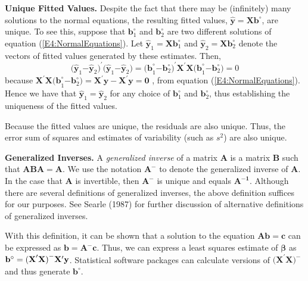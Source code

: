 \textbf{Unique Fitted Values.} Despite the fact that there may be
(infinitely) many solutions to the normal equations, the resulting
fitted values, $\mathbf{\hat{y}}=\mathbf{Xb}^{\circ }$, are unique.
To see this, suppose that $\mathbf{b}_1^{\circ }$ and
$\mathbf{b}_2^{\circ }$ are two
different solutions of equation (\ref{E4:NormalEquations}). Let $\mathbf{\hat{y}}_1=\mathbf{Xb%
}_1^{\circ }$ and $\mathbf{\hat{y}}_2=\mathbf{Xb}_2^{\circ }$ denote
the vectors of fitted values generated by these estimates. Then,
\begin{equation*}
\mathbf{(\hat{y}}_1\mathbf{-\hat{y}}_2\mathbf{)}^{\prime}\mathbf{(\hat{y%
}}_1\mathbf{-\hat{y}}_2\mathbf{)}=\mathbf{(b}_1^{\circ }\mathbf{-b}%
_2^{\circ
}\mathbf{)}^{\prime}\mathbf{X}^{\prime}\mathbf{X(b}_1^{\circ
}\mathbf{-b}_2^{\circ }\mathbf{)}=0
\end{equation*}
because $\mathbf{X}^{\prime}\mathbf{X(b}_1^{\circ
}\mathbf{-b}_2^{\circ
}\mathbf{)}=\mathbf{X}^{\prime}\mathbf{y-X}^{\prime}\mathbf{y}=\mathbf{0}$%
, from equation (\ref{E4:NormalEquations}). Hence we have that $\mathbf{\hat{y}}_1\mathbf{=%
\hat{y}}_2$ for any choice of $\mathbf{b}_1^{\circ }$ and $\mathbf{b}%
_2^{\circ }$, thus establishing the uniqueness of the fitted values.

\qquad Because the fitted values are unique, the residuals are also
unique. Thus, the error sum of squares and estimates of variability
(such as $s^2$) are also unique.

\textbf{Generalized Inverses.} A \emph{generalized inverse} of a
matrix $\mathbf{A}$
is a matrix $\mathbf{B}$ such that $\mathbf{ABA=A}$. We use the notation $%
\mathbf{A}^{\mathbf{-}}$ to denote the generalized inverse of
$\mathbf{A}$. In the case that $\mathbf{A}$ is invertible, then
$\mathbf{A}^{\mathbf{-}}$ is unique and equals
$\mathbf{A}^{\mathbf{-1}}$. Although there are several definitions
of generalized inverses, the above definition suffices for our
purposes. See Searle (1987) for further discussion of alternative
definitions of generalized inverses.

\qquad With this definition, it can be shown that a solution to the
equation $\mathbf{Ab=c}$ can be expressed as $\mathbf{b=A}^{-}
\mathbf{c}$. Thus, we
can express a least squares estimate of $\boldsymbol \beta$ as $\mathbf{b}^{%
\mathbf{\circ }}=\mathbf{(X}^{\prime}\mathbf{X)}^{\mathbf{-}}\mathbf{X}%
^{\prime}\mathbf{y}$. Statistical software packages can calculate
versions
of $\mathbf{(X}^{\prime}\mathbf{X)}^{\mathbf{-}}$ and thus generate $%
\mathbf{b}^{\mathbf{\circ }}$.

